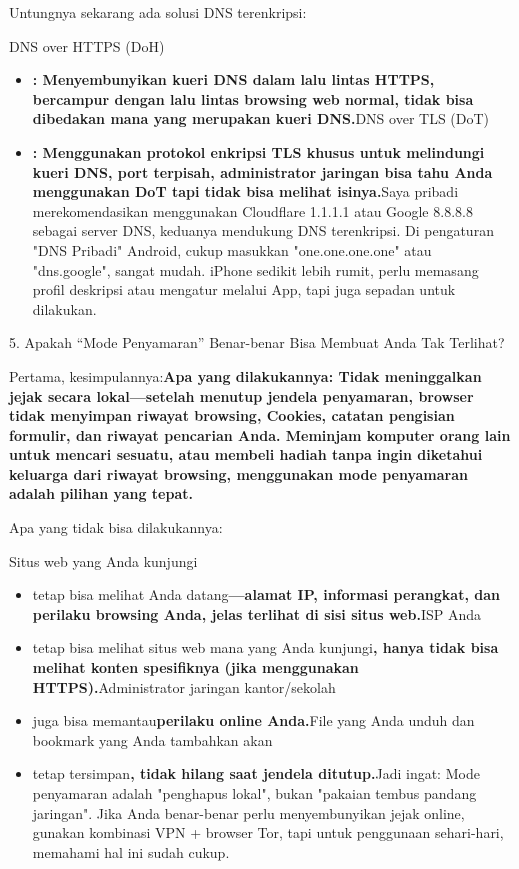 Untungnya sekarang ada solusi DNS terenkripsi:

DNS over HTTPS (DoH)

\begin{itemize}
  \item \textbf{: Menyembunyikan kueri DNS dalam lalu lintas HTTPS, bercampur dengan lalu lintas browsing web normal, tidak bisa dibedakan mana yang merupakan kueri DNS.}DNS over TLS (DoT)
  \item \textbf{: Menggunakan protokol enkripsi TLS khusus untuk melindungi kueri DNS, port terpisah, administrator jaringan bisa tahu Anda menggunakan DoT tapi tidak bisa melihat isinya.}Saya pribadi merekomendasikan menggunakan Cloudflare 1.1.1.1 atau Google 8.8.8.8 sebagai server DNS, keduanya mendukung DNS terenkripsi. Di pengaturan "DNS Pribadi" Android, cukup masukkan "one.one.one.one" atau "dns.google", sangat mudah. iPhone sedikit lebih rumit, perlu memasang profil deskripsi atau mengatur melalui App, tapi juga sepadan untuk dilakukan.
\end{itemize}

5. Apakah “Mode Penyamaran” Benar-benar Bisa Membuat Anda Tak Terlihat?


Pertama, kesimpulannya:\textbf{Apa yang dilakukannya: Tidak meninggalkan jejak secara lokal—setelah menutup jendela penyamaran, browser tidak menyimpan riwayat browsing, Cookies, catatan pengisian formulir, dan riwayat pencarian Anda. Meminjam komputer orang lain untuk mencari sesuatu, atau membeli hadiah tanpa ingin diketahui keluarga dari riwayat browsing, menggunakan mode penyamaran adalah pilihan yang tepat.}

Apa yang tidak bisa dilakukannya:

Situs web yang Anda kunjungi

\begin{itemize}
  \item tetap bisa melihat Anda datang\textbf{—alamat IP, informasi perangkat, dan perilaku browsing Anda, jelas terlihat di sisi situs web.}ISP Anda
  \item tetap bisa melihat situs web mana yang Anda kunjungi\textbf{, hanya tidak bisa melihat konten spesifiknya (jika menggunakan HTTPS).}Administrator jaringan kantor/sekolah
  \item juga bisa memantau\textbf{perilaku online Anda.}File yang Anda unduh dan bookmark yang Anda tambahkan akan
  \item tetap tersimpan\textbf{, tidak hilang saat jendela ditutup.}Jadi ingat: Mode penyamaran adalah "penghapus lokal", bukan "pakaian tembus pandang jaringan". Jika Anda benar-benar perlu menyembunyikan jejak online, gunakan kombinasi VPN + browser Tor, tapi untuk penggunaan sehari-hari, memahami hal ini sudah cukup.
\end{itemize}


